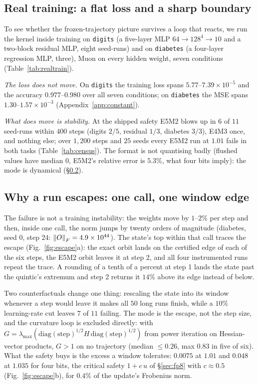 \subsection{Real training: a flat loss and a sharp boundary}
\label{sec:realtrain}

To see whether the frozen-trajectory picture survives a loop that reacts, we run the
kernel inside training on \texttt{digits} (a five-layer MLP $64\to128^4\to10$ and a
two-block residual MLP, eight seed-runs) and on \texttt{diabetes} (a four-layer regression
MLP, three), Muon on every hidden weight, seven conditions
(Table~\ref{tab:realtrain}).

\emph{The loss does not move.}  On \texttt{digits} the training loss spans
$5.77$--$7.39\times10^{-5}$ and the accuracy $0.977$--$0.980$ over all seven
conditions; on \texttt{diabetes} the MSE spans $1.30$--$1.57\times10^{-3}$
(Appendix~\ref{app:constant}).

\emph{What does move is stability.}  At the shipped safety E5M2 blows up in $6$ of $11$
seed-runs within $400$ steps (digits $2/5$, residual $1/3$, diabetes $3/3$), E4M3 once, and
nothing else; over $1{,}200$ steps and $25$ seeds every E5M2 run at $1.01$ fails in both
tasks (Table~\ref{tab:census}).  The
format is not quantising badly (flushed values have median $0$, E5M2's relative error
is $5.3\%$, what four bits imply): the mode is dynamical (\S\ref{sec:escape}).

\subsection{Why a run escapes: one call, one window edge}
\label{sec:escape}

The failure is not a training instability: the weights move by $1$--$2\%$ per step and
then, inside one call, the norm jumps by twenty orders of magnitude (diabetes, seed 0,
step 24: $\left\lVert O \right\rVert_F=4.9\times10^{44}$).  The
state's top within that call traces the escape (Fig.~\ref{fig:escape}a): the exact orbit
lands on the certified edge of each of the six steps, the E5M2 orbit
leaves it at step 2, and all four instrumented runs repeat the trace.  A rounding of a
tenth of a percent at step 1 lands the state past the quintic's extremum and step 2 returns
it $14\%$ above its edge instead of below.

Two counterfactuals change one thing: rescaling the state into its window whenever a step
would leave it makes all $50$ long runs finish, while a $10\%$ learning-rate cut
leaves $7$ of $11$ failing.  The mode is the escape, not the step size, and the curvature
loop is excluded directly: with
$G=\lambda_{\max}(\mathrm{diag}(\mathrm{step})^{1/2}H\,\mathrm{diag}(\mathrm{step})^{1/2})$
from power iteration on Hessian-vector products, $G>1$ on no trajectory (median
$\le0.26$, max $0.83$ in five of six).  What the safety buys is the excess a window
tolerates: $0.0075$ at $1.01$ and $0.048$ at $1.035$ for four bits, the critical safety
$1+c\,u$ of \S\ref{sec:fp8} with $c\approx0.5$ (Fig.~\ref{fig:escape}b), for $0.4\%$ of
the update's Frobenius norm.

